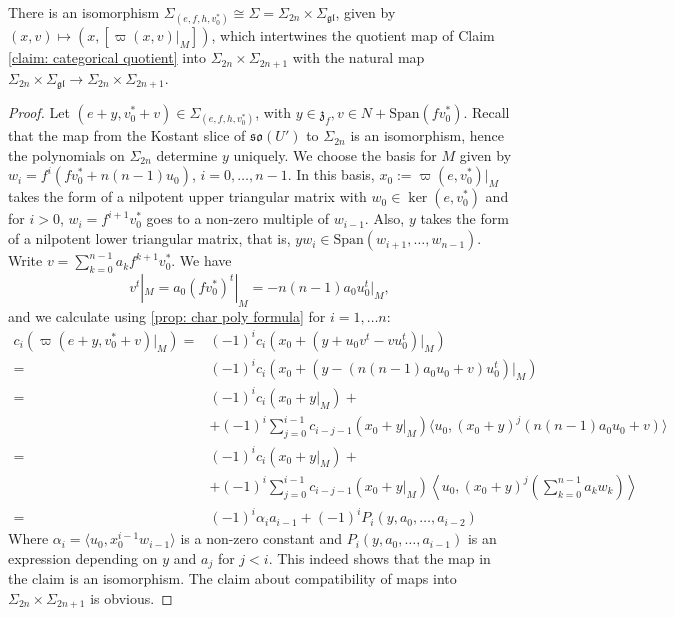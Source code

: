 \documentclass[11pt]{article}
\begin{document}
\begin{claim}\label{claim: pseudo slice}
    There is an isomorphism $\Sigma_{(e, f, h, v_0^*)}\cong \Sigma=\Sigma_{2n}\times \Sigma_{\mathfrak{gl}}$, given by $(x,v)\mapsto (x, [\varpi(x, v)|_M])$, which intertwines the quotient map of Claim \ref{claim: categorical quotient} into $\Sigma_{2n}\times \Sigma_{2n+1}$ with the natural map $\Sigma_{2n}\times \Sigma_{\mathfrak{gl}}\to \Sigma_{2n}\times \Sigma_{2n+1}$.
\end{claim}
\begin{proof}
Let $(e+y, v_0^*+v)\in \Sigma_{(e, f, h, v_0^*)}$, with $y\in \mathfrak{z}_f, v\in N+\mathrm{Span}(fv_0^*)$.
Recall that the map from the Kostant slice of $\mathfrak{so}(U')$ to $\Sigma_{2n}$ is an isomorphism, hence the polynomials on $\Sigma_{2n}$ determine $y$ uniquely.
We choose the basis for $M$ given by $w_i=f^i (fv_0^* + n(n-1)u_0)$, $i=0,\dots,n-1$.
In this basis, $x_0:=\varpi(e,v_0^*)|_M$ takes the form of a nilpotent upper triangular matrix with 
$w_0\in \ker(e, v_0^*)$ and for $i>0$, $w_i=f^{i+1}v_0^*$ goes to a non-zero multiple of $w_{i-1}$. Also, $y$ takes the form of a nilpotent lower triangular matrix, that is, $yw_i\in \mathrm{Span}(w_{i+1},\dots,w_{n-1})$.
Write $v = \sum_{k=0}^{n-1} a_k f^{k+1}v_0^*$.
We have $$v^t|_M = a_0 (fv_0^*)^t|_M = -n(n-1)a_0u_0^t|_M,$$ and we calculate using \ref{prop: char poly formula} for $i=1,\dots n$:
$$
\begin{aligned}
c_i(\varpi(e+y, v_0^*+v)|_M) =& (-1)^ic_i(x_0+(y+u_0v^t-vu_0^t)|_M)
\\=& (-1)^ic_i(x_0+(y-(n(n-1)a_0u_0+v)u_0^t)|_M)
\\=& (-1)^ic_i(x_0+y|_M) +\\&+ (-1)^i\sum_{j=0}^{i-1}c_{i-j-1}(x_0+y|_M)\langle u_0, (x_0+y)^j (n(n-1)a_0u_0+v)\rangle
\\=& (-1)^ic_i(x_0+y|_M) +\\&+ (-1)^i\sum_{j=0}^{i-1}c_{i-j-1}(x_0+y|_M)\left\langle u_0, (x_0+y)^j \left(\sum_{k=0}^{n-1}a_kw_k\right)\right\rangle
\\=& (-1)^i\alpha_i a_{i-1} + (-1)^iP_i(y, a_0,\dots, a_{i-2})
\end{aligned}
$$
Where $\alpha_i=\langle u_0, x_0^{i-1} w_{i-1}\rangle$ is a non-zero constant and $P_i(y, a_0,\dots, a_{i-1})$ is an expression depending on $y$ and $a_j$ for $j<i$.
This indeed shows that the map in the claim is an isomorphism. The claim about compatibility of maps into $\Sigma_{2n}\times \Sigma_{2n+1}$ is obvious.
\end{proof}
\end{document}
